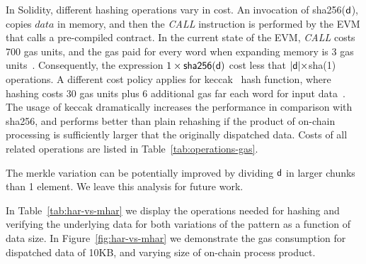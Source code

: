In Solidity, different hashing operations vary in cost. An invocation of
\textsf{sha256}($\mathsf{d}$), copies $data$ in memory, and then the
\emph{CALL} instruction is performed by the EVM that calls a pre-compiled
contract. In the current state of the EVM, \emph{CALL} costs 700 gas units, and
the gas paid for every word when expanding memory is 3 gas units~\cite{wood}.
Consequently, the expression $1 \times \textsf{sha256}(\mathsf{d})$ cost less that
$|\mathsf{d}| \times $\textsf{sha}(1) operations. A different cost policy applies
for \textsf{keccak}~\cite{keccak} hash function, where hashing costs 30 gas
units plus 6 additional gas far each word for input data~\cite{wood}. The usage
of \textsf{keccak} dramatically increases the performance in comparison with
\textsf{sha256}, and performs better than plain rehashing if the product of
on-chain processing is sufficiently larger that the originally dispatched data.
Costs of all related operations are listed in Table~\ref{tab:operations-gas}.

The merkle variation can be potentially improved by dividing $\mathsf{d}$ in larger
chunks than 1 element. We leave this analysis for future work.



In Table~\ref{tab:har-vs-mhar} we display the operations needed for hashing and
verifying the underlying data for both variations of the pattern as a function
of data size. In Figure~\ref{fig:har-vs-mhar} we demonstrate the gas
consumption for dispatched data of 10KB, and varying size of on-chain
process product.



